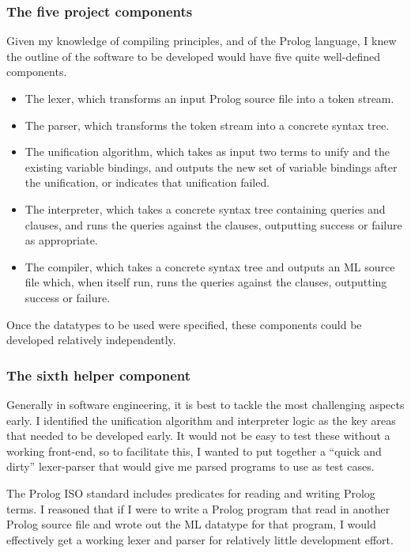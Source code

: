 \documentclass[12pt]{article}
\begin{document}
\subsubsection*{The five project components}

Given my knowledge of compiling principles, and of the Prolog language, I knew the outline of the software to be developed would have five quite well-defined components.

\begin{itemize}
\item The lexer, which transforms an input Prolog source file into a token stream.
\item The parser, which transforms the token stream into a concrete syntax tree.
\item The unification algorithm, which takes as input two terms to unify and the existing variable bindings, and outputs the new set of variable bindings after the unification, or indicates that unification failed.
\item The interpreter, which takes a concrete syntax tree containing queries and clauses, and runs the queries against the clauses, outputting success or failure as appropriate.
\item The compiler, which takes a concrete syntax tree and outputs an ML source file which, when itself run, runs the queries against the clauses, outputting success or failure.
\end{itemize}

Once the datatypes to be used were specified, these components could be developed relatively independently.

\subsubsection*{The sixth helper component}

Generally in software engineering, it is best to tackle the most challenging aspects early. 
I identified the unification algorithm and interpreter logic as the key areas that needed to be developed early. 
It would not be easy to test these without a working front-end, so to facilitate this, I wanted to put together a ``quick and dirty'' lexer-parser that would give me parsed programs to use as test cases.

The Prolog ISO standard includes predicates for reading and writing Prolog terms. 
I reasoned that if I were to write a Prolog program that read in another Prolog source file and wrote out the ML datatype for that program, I would effectively get a working lexer and parser for relatively little development effort. 
\end{document}
